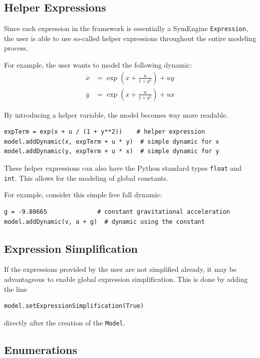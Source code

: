 \documentclass[12pt]{article}
\begin{document}
	\subsection{Helper Expressions}
	
	Since each expression in the framework is essentially a SymEngine \texttt{Expression}, the user is able to use so-called helper expressions throughout the entire modeling process.
	
	For example, the user wants to model the following dynamic:
	\begin{align*}
		\dot{x} &= \exp\left(x + \frac{u}{1 + y^2}\right) + u y \\
		\dot{y} &= \exp\left(x + \frac{u}{1 + y^2}\right) + u x
	\end{align*}
	
	By introducing a helper variable, the model becomes way more readable.
	
	\begin{lstlisting}
expTerm = exp(x + u / (1 + y**2))	 # helper expression
model.addDynamic(x, expTerm + u * y)  # simple dynamic for x
model.addDynamic(y, expTerm + u * x)  # simple dynamic for y
	\end{lstlisting}
	
	These helper expressions can also have the Python standard types \texttt{float} and \texttt{int}. This allows for the modeling of global constants.
	
	For example, consider this simple free fall dynamic:
	\begin{lstlisting}
g = -9.80665		      # constant gravitational acceleration  
model.addDynamic(v, a + g)  # dynamic using the constant
	\end{lstlisting}
	
	\subsection{Expression Simplification}
	If the expressions provided by the user are not simplified already, it may be advantageous to enable global expression simplification. This is done by adding the line
	\begin{lstlisting}
model.setExpressionSimplification(True)
	\end{lstlisting}
	directly after the creation of the \texttt{Model}.
	 
	
	\subsection{Enumerations}
	
\end{document}
